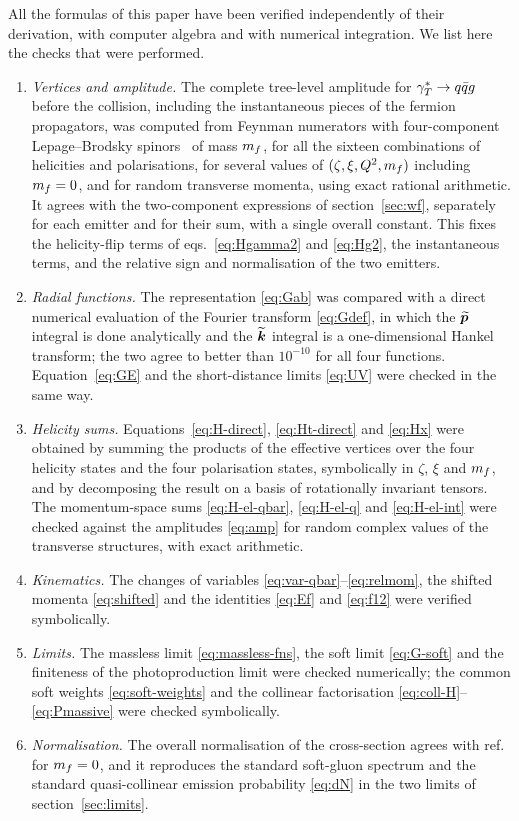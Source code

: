 All the formulas of this paper have been verified independently of their derivation, with computer
algebra and with numerical integration. We list here the checks that were performed.
\begin{enumerate}
\item \emph{Vertices and amplitude.} The complete tree-level amplitude for $\gamma^{*}_{T}\to q\bar q g$ before the
collision, including the instantaneous pieces of the fermion propagators, was computed from Feynman
numerators with four-component Lepage--Brodsky spinors~\cite{Lepage:1980fj} of mass $m_f$, for all the
sixteen combinations of helicities and polarisations, for several values of $(\zeta,\xi,Q^2,m_f)$
including $m_f=0$, and for random transverse momenta, using exact rational arithmetic. It agrees with
the two-component expressions of section~\ref{sec:wf}, separately for each emitter and for their sum,
with a single overall constant. This fixes the helicity-flip terms of eqs.~\eqref{eq:Hgamma2} and
\eqref{eq:Hg2}, the instantaneous terms, and the relative sign and normalisation of the two emitters.
\item \emph{Radial functions.} The representation \eqref{eq:Gab} was compared with a direct numerical
evaluation of the Fourier transform \eqref{eq:Gdef}, in which the $\widetilde{\bm{p}}$ integral is done analytically
and the $\widetilde{\bm{k}}$ integral is a one-dimensional Hankel transform; the two agree to better than $10^{-10}$
for all four functions. Equation~\eqref{eq:GE} and the short-distance limits \eqref{eq:UV} were checked
in the same way.
\item \emph{Helicity sums.} Equations~\eqref{eq:H-direct}, \eqref{eq:Ht-direct} and \eqref{eq:Hx} were
obtained by summing the products of the effective vertices over the four helicity states and the four
polarisation states, symbolically in $\zeta$, $\xi$ and $m_f$, and by decomposing the result on a basis
of rotationally invariant tensors. The momentum-space sums \eqref{eq:H-el-qbar}, \eqref{eq:H-el-q} and
\eqref{eq:H-el-int} were checked against the amplitudes \eqref{eq:amp} for random complex values of the
transverse structures, with exact arithmetic.
\item \emph{Kinematics.} The changes of variables \eqref{eq:var-qbar}--\eqref{eq:relmom}, the shifted
momenta \eqref{eq:shifted} and the identities \eqref{eq:Ef} and \eqref{eq:f12} were verified
symbolically.
\item \emph{Limits.} The massless limit \eqref{eq:massless-fns}, the soft limit \eqref{eq:G-soft} and
the finiteness of the photoproduction limit were checked numerically; the common soft weights
\eqref{eq:soft-weights} and the collinear factorisation \eqref{eq:coll-H}--\eqref{eq:Pmassive} were
checked symbolically.
\item \emph{Normalisation.} The overall normalisation of the cross-section agrees with
ref.~\cite{Iancu:2022gpw} for $m_f=0$, and it reproduces the standard soft-gluon spectrum and the
standard quasi-collinear emission probability \eqref{eq:dN} in the two limits of
section~\ref{sec:limits}.
\end{enumerate}
